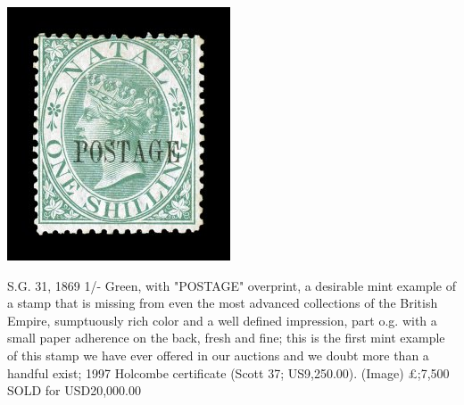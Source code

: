 \begin{marginfigure}
\centering
\includegraphics[width=.80\textwidth]{../natal/293.jpg}
\caption{ 
S.G. 31, 1869 1/- Green, with "POSTAGE" overprint, a desirable mint example of a stamp that is missing from even the most advanced collections of the British Empire, sumptuously rich color and a well defined impression, part o.g. with a small paper adherence on the back, fresh and fine; this is the first mint example of this stamp we have ever offered in our auctions and we doubt more than a handful exist; 1997 Holcombe certificate (Scott 37; US9,250.00). (Image) 	\protect\pounds;7,500
SOLD for USD20,000.00}
\end{marginfigure}

